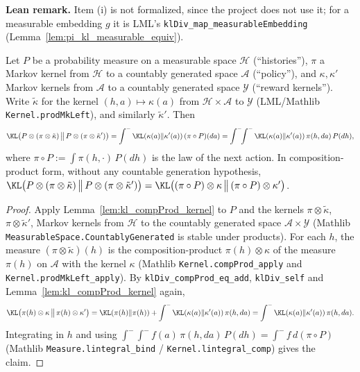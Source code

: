 \textbf{Lean remark.} Item (i) is not formalized, since the project does not use it; for a
measurable embedding $g$ it is LML's \texttt{klDiv\_map\_measurableEmbedding}
(Lemma~\ref{lem:pi_kl_measurable_equiv}).

\begin{lemma}\label{lem:pi_kl_step}
\leanok
{}
Let $P$ be a probability measure on a measurable space $\mathcal{H}$ (``histories''), $\pi$ a
Markov kernel from $\mathcal{H}$ to a countably generated space $\mathcal{A}$ (``policy''),
and $\kappa,\kappa'$ Markov kernels from $\mathcal{A}$ to a countably generated space
$\mathcal{Y}$ (``reward kernels'').
Write $\tilde\kappa$ for the kernel $(h,a)\mapsto\kappa(a)$ from $\mathcal{H}\times\mathcal{A}$
to $\mathcal{Y}$ (LML/Mathlib \texttt{Kernel.prodMkLeft}), and similarly $\tilde\kappa'$. Then
\[
  \KL\big(P\otimes(\pi\otimes\tilde\kappa)\,\big\|\,P\otimes(\pi\otimes\tilde\kappa')\big)
  = \int^- \KL(\kappa(a)\|\kappa'(a))\,(\pi\circ P)(da)
  = \int^-\!\!\int^- \KL(\kappa(a)\|\kappa'(a))\,\pi(h,da)\,P(dh),
\]
where $\pi\circ P := \int \pi(h,\cdot)\,P(dh)$ is the law of the next action. In
composition-product form, without any countable generation hypothesis,
$\KL\big(P\otimes(\pi\otimes\tilde\kappa)\,\big\|\,P\otimes(\pi\otimes\tilde\kappa')\big)
  = \KL\big((\pi\circ P)\otimes\kappa\,\big\|\,(\pi\circ P)\otimes\kappa'\big)$.
\end{lemma}

\begin{proof}
\leanok
{}
Apply Lemma~\ref{lem:kl_compProd_kernel} to $P$ and the kernels $\pi\otimes\tilde\kappa$,
$\pi\otimes\tilde\kappa'$, Markov kernels from $\mathcal{H}$ to the countably generated space
$\mathcal{A}\times\mathcal{Y}$ (Mathlib \texttt{MeasurableSpace.CountablyGenerated} is stable
under products). For each $h$, the measure
$(\pi\otimes\tilde\kappa)(h)$ is the composition-product $\pi(h)\otimes\kappa$ of the measure
$\pi(h)$ on $\mathcal{A}$ with the kernel $\kappa$ (Mathlib
\texttt{Kernel.compProd\_apply} and \texttt{Kernel.prodMkLeft\_apply}). By
\texttt{klDiv\_compProd\_eq\_add}, \texttt{klDiv\_self} and Lemma~\ref{lem:kl_compProd_kernel}
again,
\[
  \KL\big(\pi(h)\otimes\kappa\,\big\|\,\pi(h)\otimes\kappa'\big)
  = \KL(\pi(h)\|\pi(h)) + \int^-\KL(\kappa(a)\|\kappa'(a))\,\pi(h,da)
  = \int^-\KL(\kappa(a)\|\kappa'(a))\,\pi(h,da).
\]
Integrating in $h$ and using $\int^-\!\int^- f(a)\,\pi(h,da)\,P(dh) = \int^- f\,d(\pi\circ P)$
(Mathlib \texttt{Measure.lintegral\_bind} / \texttt{Kernel.lintegral\_comp}) gives the claim.
\end{proof}


